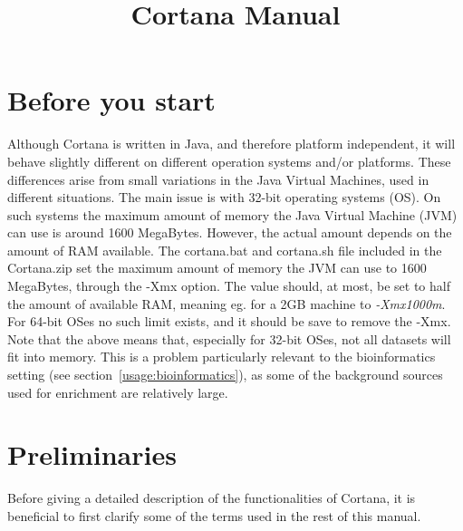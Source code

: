 \documentclass{article}
\begin{document}
\title{Cortana Manual}

\maketitle


\section{Before you start}
\label{section:before}
Although Cortana is written in Java, and therefore platform independent, it will behave slightly different on different operation systems and/or platforms.
These differences arise from small variations in the Java Virtual Machines, used in different situations.
The main issue is with 32-bit operating systems (OS).
On such systems the maximum amount of memory the Java Virtual Machine (JVM) can use is around 1600 MegaBytes.
However, the actual amount depends on the amount of RAM available.
The cortana.bat and cortana.sh file included in the Cortana.zip set the maximum amount of memory the JVM can use to 1600 MegaBytes, through the -Xmx option.
The value should, at most, be set to half the amount of available RAM, meaning eg. for a 2GB machine to \emph{-Xmx1000m}.
For 64-bit OSes no such limit exists, and it should be save to remove the -Xmx.
Note that the above means that, especially for 32-bit OSes, not all datasets will fit into memory.
This is a problem particularly relevant to the bioinformatics setting (see section~\ref{usage:bioinformatics}), as some of the background sources used for enrichment are relatively large.





\section{Preliminaries}
\label{section:preliminaries}
Before giving a detailed description of the functionalities of Cortana, it is beneficial to first clarify some of the terms used in the rest of this manual.
\end{document}
